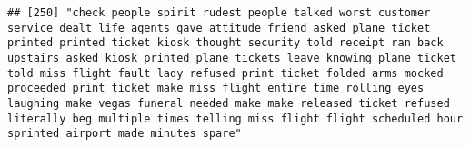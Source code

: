 \documentclass[
]{article}
\begin{document}
\begin{verbatim}
## [250] "check people spirit rudest people talked worst customer service dealt life agents gave attitude friend asked plane ticket printed printed ticket kiosk thought security told receipt ran back upstairs asked kiosk printed plane tickets leave knowing plane ticket told miss flight fault lady refused print ticket folded arms mocked proceeded print ticket make miss flight entire time rolling eyes laughing make vegas funeral needed make make released ticket refused literally beg multiple times telling miss flight flight scheduled hour sprinted airport made minutes spare"                                                                                                                                                                                                                                                                                                                                                                                                                                                                                                                                                                                                                                                                                                                                                                                                                                                                                                                                                                                                                                                                                                                                                                                                      

\end{verbatim}
\end{document}

